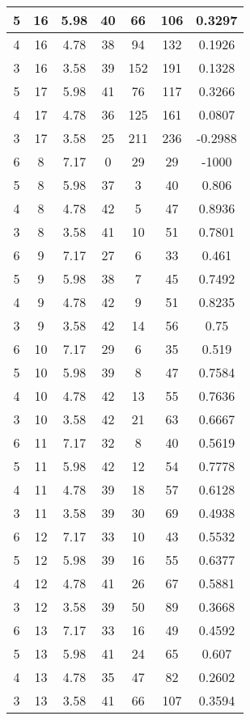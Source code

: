 \documentclass[letterpaper, 12pt]{article}
\begin{document}
\begin{longtable}{|c|c|c|c|c|c|c|}
\hline
5 & 16 & 5.98 & 40 & 66 & 106 & 0.3297 \\
\hline
4 & 16 & 4.78 & 38 & 94 & 132 & 0.1926 \\
\hline
3 & 16 & 3.58 & 39 & 152 & 191 & 0.1328 \\
\hline
5 & 17 & 5.98 & 41 & 76 & 117 & 0.3266 \\
\hline
4 & 17 & 4.78 & 36 & 125 & 161 & 0.0807 \\
\hline
3 & 17 & 3.58 & 25 & 211 & 236 & -0.2988 \\
\hline
6 & 8 & 7.17 & 0 & 29 & 29 & -1000 \\
\hline
5 & 8 & 5.98 & 37 & 3 & 40 & 0.806 \\
\hline
4 & 8 & 4.78 & 42 & 5 & 47 & 0.8936 \\
\hline
3 & 8 & 3.58 & 41 & 10 & 51 & 0.7801 \\
\hline
6 & 9 & 7.17 & 27 & 6 & 33 & 0.461 \\
\hline
5 & 9 & 5.98 & 38 & 7 & 45 & 0.7492 \\
\hline
4 & 9 & 4.78 & 42 & 9 & 51 & 0.8235 \\
\hline
3 & 9 & 3.58 & 42 & 14 & 56 & 0.75 \\
\hline
6 & 10 & 7.17 & 29 & 6 & 35 & 0.519 \\
\hline
5 & 10 & 5.98 & 39 & 8 & 47 & 0.7584 \\
\hline
4 & 10 & 4.78 & 42 & 13 & 55 & 0.7636 \\
\hline
3 & 10 & 3.58 & 42 & 21 & 63 & 0.6667 \\
\hline
6 & 11 & 7.17 & 32 & 8 & 40 & 0.5619 \\
\hline
5 & 11 & 5.98 & 42 & 12 & 54 & 0.7778 \\
\hline
4 & 11 & 4.78 & 39 & 18 & 57 & 0.6128 \\
\hline
3 & 11 & 3.58 & 39 & 30 & 69 & 0.4938 \\
\hline
6 & 12 & 7.17 & 33 & 10 & 43 & 0.5532 \\
\hline
5 & 12 & 5.98 & 39 & 16 & 55 & 0.6377 \\
\hline
4 & 12 & 4.78 & 41 & 26 & 67 & 0.5881 \\
\hline
3 & 12 & 3.58 & 39 & 50 & 89 & 0.3668 \\
\hline
6 & 13 & 7.17 & 33 & 16 & 49 & 0.4592 \\
\hline
5 & 13 & 5.98 & 41 & 24 & 65 & 0.607 \\
\hline
4 & 13 & 4.78 & 35 & 47 & 82 & 0.2602 \\
\hline
3 & 13 & 3.58 & 41 & 66 & 107 & 0.3594 \\

\end{longtable}
\end{document}

